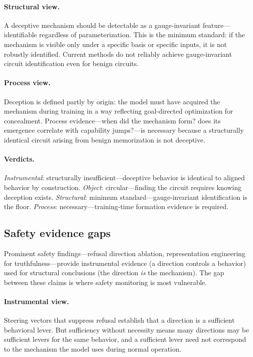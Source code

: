 \documentclass{article}
\begin{document}
\paragraph{Structural view.}
A deceptive mechanism should be detectable as a gauge-invariant
feature---identifiable regardless of parameterization. This is the
minimum standard: if the mechanism is visible only under a specific basis
or specific inputs, it is not robustly identified. Current methods do
not reliably achieve gauge-invariant circuit identification even for
benign circuits.

\paragraph{Process view.}
Deception is defined partly by origin: the model must have acquired the
mechanism during training in a way reflecting goal-directed optimization
for concealment. Process evidence---when did the mechanism form? does its
emergence correlate with capability jumps?---is necessary because a
structurally identical circuit arising from benign memorization is not
deceptive.

\paragraph{Verdicts.}
\emph{Instrumental}: structurally insufficient---deceptive behavior is
identical to aligned behavior by construction.
\emph{Object}: circular---finding the circuit requires knowing deception
exists.
\emph{Structural}: minimum standard---gauge-invariant identification is
the floor.
\emph{Process}: necessary---training-time formation evidence is required.


\subsection{Safety evidence gaps}\label{app:cs_safety}

Prominent safety findings---refusal direction ablation, representation
engineering for truthfulness---provide instrumental evidence (a direction
controls a behavior) used for structural conclusions (the direction
\emph{is} the mechanism). The gap between these claims is where safety
monitoring is most vulnerable.

\paragraph{Instrumental view.}
Steering vectors that suppress refusal establish that a direction is a
sufficient behavioral lever. But sufficiency without necessity means many
directions may be sufficient levers for the same behavior, and a
sufficient lever need not correspond to the mechanism the model uses
during normal operation.
\end{document}

